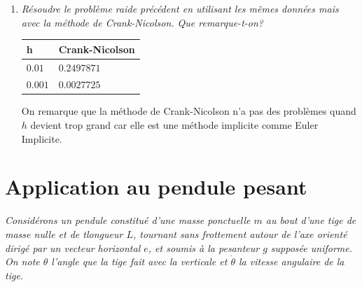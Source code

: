 \documentclass[a4paper,10pt]{article}
\begin{document}
\begin{enumerate}
    \item \emph{Résoudre le problème raide précédent en utilisant les mêmes données mais
    avec la méthode de Crank-Nicolson. Que remarque-t-on?}

    \begin{center}
    \begin{tabular}{|l|l|}\hline
        h         & Crank-Nicolson \\\hline
        $0.01$    & $0.2497871$  \\\hline
        $0.001$   & $0.0027725$     \\\hline
    \end{tabular}
\end{center}

    On remarque que la méthode de Crank-Nicolson n'a pas des problèmes quand $h$
    devient trop grand car elle est une méthode implicite comme Euler Implicite.
\end{enumerate}

\section{Application au pendule pesant}
\emph{Considérons un pendule constitué d'une masse ponctuelle $m$ au bout d'une tige de
masse nulle et de tlongueur $L$, tournant sans frottement autour de l'axe orienté
dirigé par un vecteur horizontal $e$, et soumis à la pesanteur $g$ supposée uniforme.
On note $\theta$ l'angle que la tige fait avec la verticale et $\dot{\theta}$ la
vitesse angulaire de la tige.}
\end{document}
